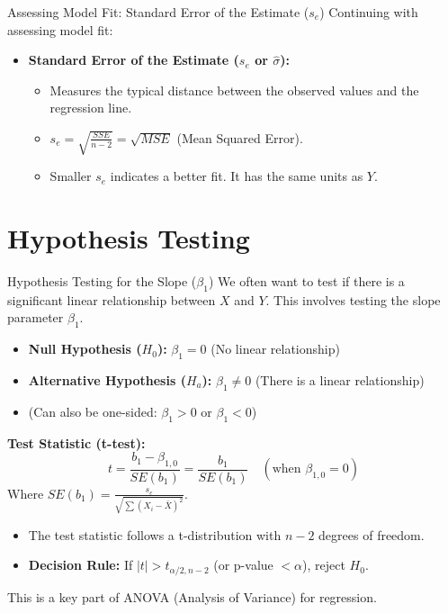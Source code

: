 \documentclass[aspectratio=169]{beamer}
\begin{document}
\begin{frame}{Assessing Model Fit: Standard Error of the Estimate ($s_e$)}
  Continuing with assessing model fit:
  \begin{itemize}
    \item \textbf{Standard Error of the Estimate ($s_e$ or $\hat{\sigma}$):}
    \begin{itemize}
        \item Measures the typical distance between the observed values and the regression line.
        \item $s_e = \sqrt{\frac{SSE}{n-2}} = \sqrt{MSE}$ (Mean Squared Error).
        \item Smaller $s_e$ indicates a better fit. It has the same units as $Y$.
    \end{itemize}
  \end{itemize}
\end{frame}

\section{Hypothesis Testing}
\begin{frame}{Hypothesis Testing for the Slope ($\beta_1$)}
  We often want to test if there is a significant linear relationship between $X$ and $Y$. This involves testing the slope parameter $\beta_1$.
  \begin{itemize}
    \item \textbf{Null Hypothesis ($H_0$):} $\beta_1 = 0$ (No linear relationship)
    \item \textbf{Alternative Hypothesis ($H_a$):} $\beta_1 \neq 0$ (There is a linear relationship)
    \item (Can also be one-sided: $\beta_1 > 0$ or $\beta_1 < 0$)
  \end{itemize}
  \textbf{Test Statistic (t-test):}
  \begin{equation*}
    t = \frac{b_1 - \beta_{1,0}}{SE(b_1)} = \frac{b_1}{SE(b_1)} \quad (\text{when } \beta_{1,0}=0)
  \end{equation*}
  Where $SE(b_1) = \frac{s_e}{\sqrt{\sum (X_i - \bar{X})^2}}$.
  \begin{itemize}
    \item The test statistic follows a t-distribution with $n-2$ degrees of freedom.
    \item \textbf{Decision Rule:} If $|t| > t_{\alpha/2, n-2}$ (or p-value $< \alpha$), reject $H_0$.
  \end{itemize}
  This is a key part of ANOVA (Analysis of Variance) for regression.
\end{frame}
\end{document}
